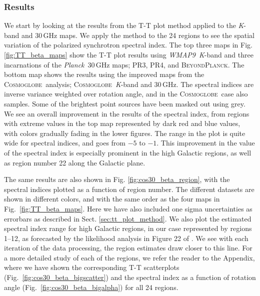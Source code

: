 \documentclass[twocolumn]{../../common/aa}
\def\WMAPnine{\emph{WMAP9}}
\def\Planck{\emph{Planck}}
\newcommand{\bp}{\textsc{BeyondPlanck}}
\newcommand{\cosmoglobe}{\textsc{Cosmoglobe}}
\newcommand{\K}[0]{\textit K}
\begin{document}
\subsubsection{Results}
\label{sec:tt_plot_results}

We start by looking at the results from the T-T plot method applied to the \K-band and 30\,GHz maps. We apply the method to the 24 regions to see the spatial variation of the polarized synchrotron spectral index. The top three maps in Fig. \ref{fig:TT_beta_maps} show the T-T plot results using \WMAPnine\ \K-band and three incarnations of the \Planck\ 30\,GHz maps; PR3, PR4, and \bp. The bottom map shows the results using the improved maps from the \cosmoglobe\ analysis; \cosmoglobe\ \K-band and 30\,GHz. The spectral indices are inverse variance weighted over rotation angle, and in the \cosmoglobe\ case also samples. Some of the brightest point sources have been masked out using grey. We see an overall improvement in the results of the spectral index, from regions with extreme values in the top map represented by dark red and blue values, with colors gradually fading in the lower figures. The range in the plot is quite wide for spectral indices, and goes from $-5$ to $-1$. This improvement in the value of the spectral index is especially prominent in the high Galactic regions, as well as region  number 22 along the Galactic plane.

The same results are also shown in Fig. \ref{fig:cos30_beta_region}, with the spectral indices plotted as a function of region number. The different datasets are shown in different colors, and with the same order as the four maps in Fig.~\ref{fig:TT_beta_maps}. Here we have also included one sigma uncertainties as errorbars as described in Sect. \ref{sec:tt_plot_method}. We also plot the estimated spectral index range for high Galactic regions, in our case represented by regions 1--12, as forecasted by the likelihood analysis in Figure 22 of \citet{planck2016-l05}. We see with each iteration of the data processing, the region estimates draw closer to this line.
For a more detailed study of each of the regions, we refer the reader to the Appendix, where we have shown the corresponding T-T scatterplots (Fig.~\ref{fig:cos30_beta_bigscatter}) and the spectral index as a function of rotation angle (Fig.~\ref{fig:cos30_beta_bigalpha}) for all 24 regions.
\end{document}

